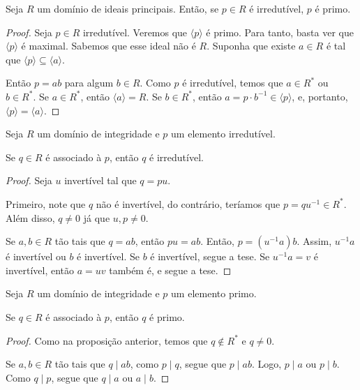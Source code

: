\begin{prop}
    Seja $R$ um domínio de ideais principais.
    Então, se $p \in R$ é irredutível, $p$ é primo.
\end{prop}
\begin{proof}
    Seja $p \in R$ irredutível.
    Veremos que $\langle p\rangle$ é primo.
    Para tanto, basta ver que $\langle p\rangle$ é maximal.
    Sabemos que esse ideal não é $R$.
    Suponha que existe $a \in R$ é tal que $\langle p\rangle \subseteq \langle a\rangle$.

    Então $p=ab$ para algum $b \in R$.
    Como $p$ é irredutível, temos que $a \in R^*$ ou $b \in R^*$.
    Se $a \in R^*$, então $\langle a\rangle=R$.
    Se $b \in R^*$, então $a=p\cdot b^{-1}\in \langle p\rangle$, e, portanto, $\langle p\rangle=\langle a\rangle$.
\end{proof}

\begin{lemma}
Seja $R$ um domínio de integridade e $p$ um elemento irredutível.

Se $q \in R$ é associado à $p$, então $q$ é irredutível.
\end{lemma}
\begin{proof}
    Seja $u$ invertível tal que $q=pu$.

    Primeiro, note que $q$ não é invertível, do contrário, teríamos que $p=qu^{-1} \in R^*$.
    Além disso, $q\neq 0$ já que $u, p\neq 0$.

    Se $a, b \in R$ tão tais que $q=ab$, então $pu=ab$.
    Então, $p=(u^{-1}a)b$.
    Assim, $u^{-1}a$ é invertível ou $b$ é invertível.
    Se $b$ é invertível, segue a tese.
    Se $u^{-1}a=v$ é invertível, então $a=uv$ também é, e segue a tese.
\end{proof}

\begin{lemma}
    Seja $R$ um domínio de integridade e $p$ um elemento primo.
    
    Se $q \in R$ é associado à $p$, então $q$ é primo.
\end{lemma}
    
\begin{proof}
    Como na proposição anterior, temos que $q\notin R^*$ e $q\neq 0$.

    Se $a, b \in R$ tão tais que $q\mid ab$, como $p\mid q$, segue que $p\mid ab$.
    Logo, $p\mid a$ ou $p\mid b$.
    Como $q\mid p$, segue que $q\mid a$ ou $a\mid b$.
\end{proof}



